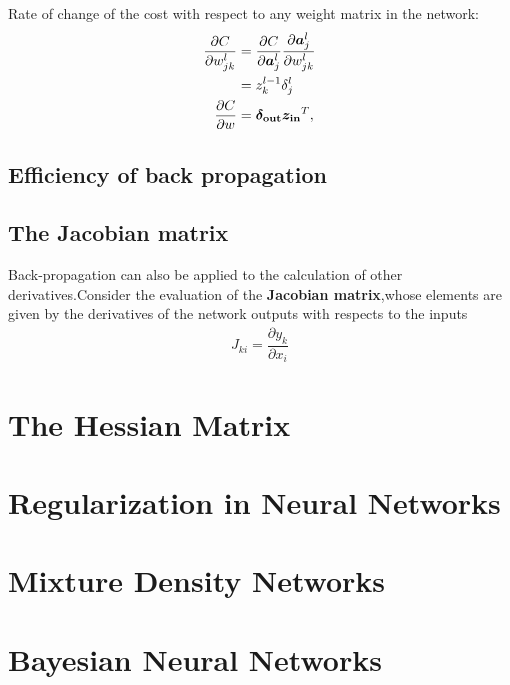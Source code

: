 Rate of change of the cost with respect to any weight matrix in the network:
\begin{align}
    \frac{\partial C}{\partial w^l_{jk}} 
&= \frac{\partial C}{\partial \vec{a}^l_j}\frac{\partial \vec{a}^l_j}{\partial w^l_{jk}}\\
&= z^{l-1}_k \delta^l_j \\
\frac{\partial C}{\partial w} &= \vec{\delta_{\rm out}} \vec{z_{\rm in}}^T,
\end{align}

\subsection{Efficiency of back propagation}

\subsection{The Jacobian matrix}
Back-propagation can also be applied to the calculation of other derivatives.Consider the evaluation of the \textbf{Jacobian matrix},whose elements are given by the derivatives of the network outputs with respects to the inputs
\begin{align}
    J_{ki}=\dfrac{\partial y_k}{\partial x_i}
\end{align}


\section{The Hessian Matrix}

\section{Regularization in Neural Networks}










\section{Mixture Density Networks}

\section{Bayesian Neural Networks}
